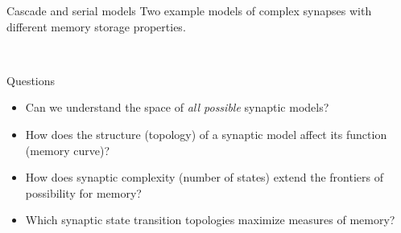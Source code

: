 \documentclass[final,hyperref={pdfpagelabels=false,bookmarks=false}]{beamer}
\begin{document}
\begin{frame}{}
\begin{columns}[t]
\begin{column}{0.36\linewidth}
\begin{block}{Cascade and serial models}
%
 Two example models of complex synapses with different memory storage properties.
 \parbox[t]{0.47\linewidth}{
 \begin{center}
  \\%
  \vp\vp{}
 \end{center}
 }
 \parbox[t]{0.47\linewidth}{
 \begin{center}
 \end{center}
}


%
\end{block}



\begin{block}{Questions}
%
 \begin{itemize}
   \item Can we understand the space of \emph{all possible} synaptic models?
   \item How does the structure (topology) of a synaptic model affect its function (memory curve)?
   \item How does synaptic complexity (number of states) extend the frontiers of possibility for memory?
   \item Which synaptic state transition topologies maximize measures of memory?
 \end{itemize}
%
\end{block}


\end{column}
\end{columns}
\end{frame}
\end{document}
